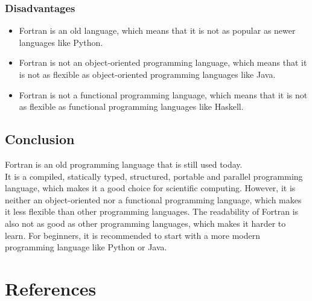 \documentclass[11pt,a4paper]{scrartcl}
\begin{document}
\begin{center}
\subsubsection{Disadvantages}
\begin{itemize}
\item Fortran is an old language, which means that it is not as popular as newer languages like Python.
\item Fortran is not an object-oriented programming language, which means that it is not as flexible as object-oriented programming languages like Java.
\item Fortran is not a functional programming language, which means that it is not as flexible as functional programming languages like Haskell.
\end{itemize}

\subsection{Conclusion}
Fortran is an old programming language that is still used today.\\
It is a compiled, statically typed, structured, portable and parallel programming language, which makes it a good choice for scientific computing. However, it is neither an object-oriented nor a functional programming language, which makes it less flexible than other programming languages.
The readability of Fortran is also not as good as other programming languages, which makes it harder to learn.
For beginners, it is recommended to start with a more modern programming language like Python or Java.\\

\section{References}

\end{center}
\end{document}
